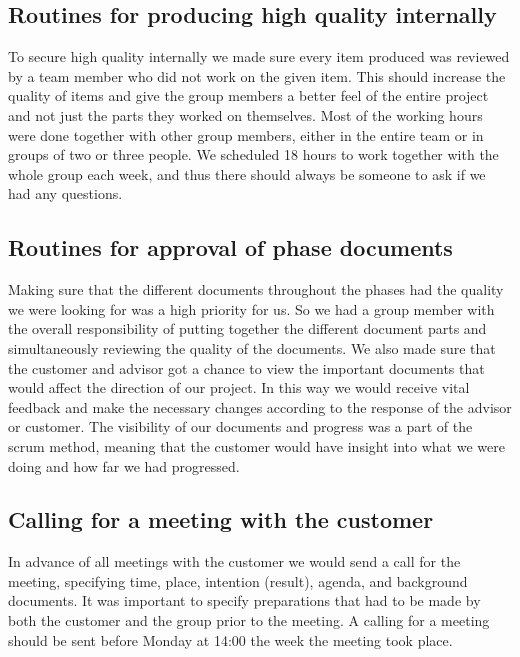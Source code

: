 \subsection{Routines for producing high quality internally}
To secure high quality internally we made sure every item produced was reviewed by a team member who did not work on the given item. This should increase the quality of items and give the group members a better feel of the entire project and not just the parts they worked on themselves. 
\newline
\newline
Most of the working hours were done together with other group members, either in the entire team or in groups of two or three people. We scheduled 18 hours to work together with the whole group each week, and thus there should always be someone to ask if we had any questions.

\subsection{Routines for approval of phase documents}
Making sure that the different documents throughout the phases had the quality we were looking for was a high priority for us. So we had a group member with the overall responsibility of putting together the different document parts and simultaneously reviewing the quality of the documents.
\newline
\newline 
We also made sure that the customer and advisor got a chance to view the important documents that would affect the direction of our project. In this way we would receive vital feedback and make the necessary changes according to the response of the advisor or customer. 
\newline
\newline
The visibility of our documents and progress was a part of the scrum method, meaning that the customer would have insight into what we were doing and how far we had progressed.   

\subsection{Calling for a meeting with the customer}
In advance of all meetings with the customer we would send a call for the meeting, specifying time, place, intention (result), agenda, and background documents. It was important to specify preparations that had to be made by both the customer and the group prior to the meeting.
\newline
\newline
A calling for a meeting should be sent before Monday at 14:00 the week the meeting took place.

